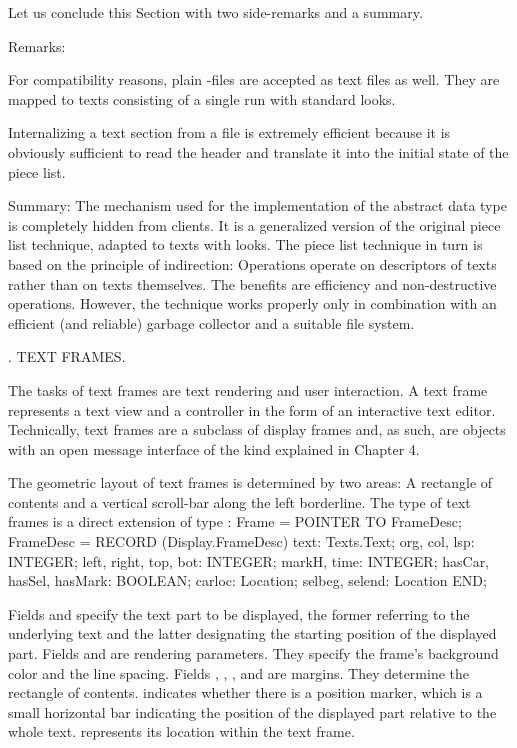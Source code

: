 Let us conclude this Section with two side-remarks and a summary.

\noindent Remarks:

{ \narrower

For compatibility reasons, plain -files are accepted as text files as well. They are mapped to texts consisting of a single run with standard looks.

Internalizing a text section from a file is extremely efficient because it is obviously sufficient to read the header and translate it into the initial state of the piece list.

}

\noindent Summary: The mechanism used for the implementation of the abstract data type  is completely hidden from clients. It is a generalized version of the original piece list technique, adapted to texts with looks. The piece list technique in turn is based on the principle of indirection: Operations operate on descriptors of texts rather than on texts themselves. The benefits are efficiency and non-destructive operations. However, the technique works properly only in combination with an efficient (and reliable) garbage collector and a suitable file system.

. TEXT FRAMES.

The tasks of text frames are text rendering and user interaction. A text frame represents a text view and a controller in the form of an interactive text editor. Technically, text frames are a subclass of display frames and, as such, are objects with an open message interface of the kind explained in Chapter 4.

The geometric layout of text frames is determined by two areas: A rectangle of contents and a vertical scroll-bar along the left borderline. The type of text frames is a direct extension of type :
\begintt
Frame = POINTER TO FrameDesc;
FrameDesc = RECORD (Display.FrameDesc)
  text: Texts.Text;
  org, col, lsp: INTEGER;
  left, right, top, bot: INTEGER;
  markH, time: INTEGER;
  hasCar, hasSel, hasMark: BOOLEAN;
  carloc: Location;
  selbeg, selend: Location
END;
\endtt

\noindent Fields  and  specify the text part to be displayed, the former referring to the underlying text and the latter designating the starting position of the displayed part. Fields  and  are rendering parameters. They specify the frame's background color and the line spacing. Fields , , , and  are margins. They determine the rectangle of contents.  indicates whether there is a position marker, which is a small horizontal bar indicating the position of the displayed part relative to the whole text.  represents its location within the text frame.

